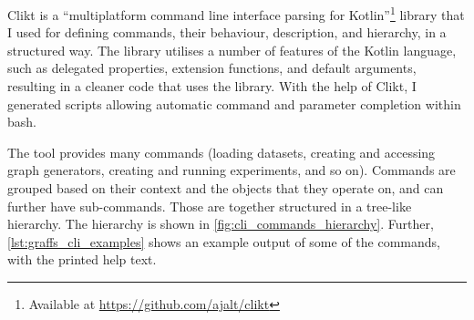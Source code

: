 Clikt is a \enquote{multiplatform command line interface parsing for Kotlin}\footnote{Available at \url{https://github.com/ajalt/clikt}} library that I used for defining commands, their behaviour, description, and hierarchy, in a structured way.
The library utilises a number of features of the Kotlin language, such as delegated properties, extension functions, and default arguments, resulting in a cleaner code that uses the library.
With the help of Clikt, I generated scripts allowing automatic command and parameter completion within bash.

The \graffs tool provides many commands (loading datasets, creating and accessing graph generators, creating and running experiments, and so on).
Commands are grouped based on their context and the objects that they operate on, and can further have sub-commands.
Those are together structured in a tree-like hierarchy.
The hierarchy is shown in \autoref{fig:cli_commands_hierarchy}.
Further, \cref{lst:graffs_cli_examples} shows an example output of some of the commands, with the printed help text.


